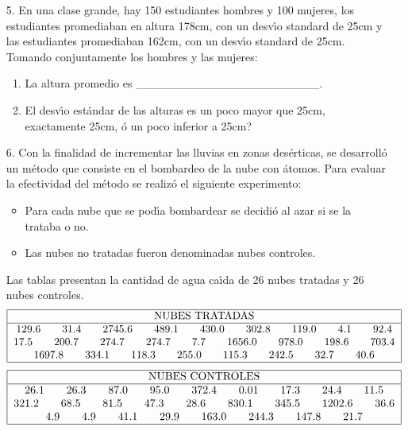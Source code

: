 \documentclass[11pt,a4paper,twoside]{article}%
\begin{document}
\begin{enumerate}
\item[5.] En una clase grande, hay 150 estudiantes hombres y 100 mujeres, los
estudiantes promediaban en altura 178cm, con un desv\'{\i}o standard de 25cm y
las estudiantes promediaban 162cm, con un desv\'{\i}o standard de 25cm.
Tomando conjuntamente los hombres y las mujeres:

\begin{enumerate}
\item La altura promedio es \_\_\_\_\_\_\_\_\_\_\_\_\_\_\_\_\_\_\_\_\_\_.

\item El desv\'{\i}o est\'{a}ndar de las alturas es \textquestiondown un poco
mayor que 25cm, exactamente 25cm, \'{o} un poco inferior a 25cm?
\end{enumerate}

\item[6.] Con la finalidad de incrementar las lluvias en zonas des\'{e}rticas,
se desarroll\'{o} un m\'{e}todo que consiste en el bombardeo de la nube con
\'{a}tomos. Para evaluar la efectividad del m\'{e}todo se realiz\'{o} el
siguiente experimento:

\begin{itemize}
\item Para cada nube que se pod\'{\i}a bombardear se decidi\'{o} al azar si se
la trataba o no.

\item Las nubes no tratadas fueron denominadas nubes controles.
\end{itemize}

Las tablas presentan la cantidad de agua ca\'{\i}da de 26 nubes tratadas y 26
nubes controles.%
\[%
\begin{tabular}
[c]{|c|}\hline
NUBES TRATADAS\\\hline
129.6\qquad31.4\qquad2745.6\qquad489.1\qquad430.0\qquad302.8\qquad
119.0\qquad4.1\qquad92.4\\
17.5\qquad200.7\qquad274.7\qquad274.7\qquad7.7\qquad1656.0\qquad
978.0\qquad198.6\qquad703.4\\
1697.8\qquad334.1\qquad118.3\qquad255.0\qquad115.3\qquad242.5\qquad
32.7\qquad40.6\\\hline
\end{tabular}
\
\]%
\[%
\begin{tabular}
[c]{|c|}\hline
NUBES CONTROLES\\\hline
26.1\qquad26.3\qquad87.0\qquad95.0\qquad372.4\qquad0.01\qquad17.3\qquad
24.4\qquad11.5\\
321.2\qquad68.5\qquad81.5\qquad47.3\qquad28.6\qquad830.1\qquad345.5\qquad
1202.6\qquad36.6\\
4.9\qquad4.9\qquad41.1\qquad29.9\qquad163.0\qquad244.3\qquad147.8\qquad
21.7\\\hline
\end{tabular}
\
\]



\end{enumerate}
\end{document}
